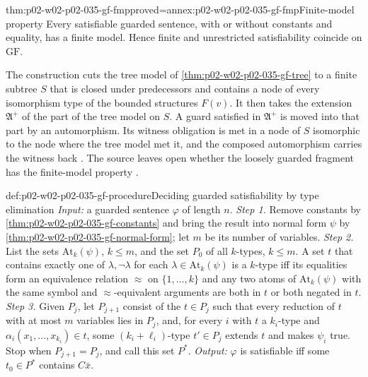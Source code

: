 \begin{hbtheorem}{thm:p02-w02-p02-035-gf-fmp}{proved=annex:p02-w02-p02-035-gf-fmp}{Finite-model property}
Every satisfiable guarded sentence, with or without constants and equality,
has a finite model.  Hence finite and unrestricted satisfiability coincide on
\(\mathrm{GF}\).
\end{hbtheorem}

The construction cuts the tree model of \cref{thm:p02-w02-p02-035-gf-tree} to
a finite subtree \(S\) that is closed under predecessors and contains a node
of every isomorphism type of the bounded structures \(F(v)\).  It then takes
the extension \(\mathfrak A^{+}\) of the part of the tree model on \(S\).  A
guard satisfied in \(\mathfrak A^{+}\) is moved into that part by an
automorphism.  Its witness obligation is met in a node of \(S\) isomorphic to
the node where the tree model met it, and the composed automorphism carries
the witness back \cite[thm.~3.10]{Gradel1999}.  The source leaves open
whether the loosely guarded fragment has the finite-model property
\cite[remark after thm.~3.10]{Gradel1999}.

\begin{hbmethod}{def:p02-w02-p02-035-gf-procedure}{Deciding guarded satisfiability by type elimination}
\emph{Input:} a guarded sentence \(\varphi\) of length \(n\).
\emph{Step 1.} Remove constants by \cref{thm:p02-w02-p02-035-gf-constants}
and bring the result into normal form \(\psi\) by
\cref{thm:p02-w02-p02-035-gf-normal-form}; let \(m\) be its number of
variables.
\emph{Step 2.} List the sets \(\mathrm{At}_k(\psi)\), \(k\leq m\), and the set
\(P_0\) of all \(k\)-types, \(k\leq m\).  A set \(t\) that contains exactly one
of \(\lambda,\neg\lambda\) for each \(\lambda\in\mathrm{At}_k(\psi)\) is a
\(k\)-type iff its equalities form an equivalence relation \(\approx\) on
\(\{1,\ldots,k\}\) and any two atoms of \(\mathrm{At}_k(\psi)\) with the same
symbol and \(\approx\)-equivalent arguments are both in \(t\) or both negated
in \(t\).
\emph{Step 3.} Given \(P_j\), let \(P_{j+1}\) consist of the \(t\in P_j\) such
that every reduction of \(t\) with at most \(m\) variables lies in \(P_j\),
and, for every \(i\) with \(t\) a \(k_i\)-type and \(\alpha_i(x_1,\ldots,x_{k_i})\in t\),
some \((k_i+\ell_i)\)-type \(t'\in P_j\) extends \(t\) and makes \(\psi_i\)
true.  Stop when
\(P_{j+1}=P_j\), and call this set \(P^{*}\).
\emph{Output:} \(\varphi\) is satisfiable iff some \(t_0\in P^{*}\) contains
\(C\bar x\).
\end{hbmethod}

